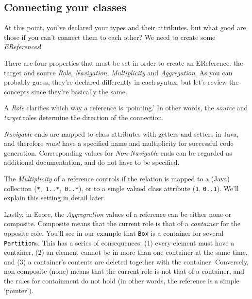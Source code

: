 \newpage
\subsection{Connecting your classes}
\genHeader
\hypertarget{static:references splash}{}

At this point, you've declared your types and their attributes, but what good are those if you can't connect them to each other? We need to create some
\emph{EReferences}!

There are four properties that must be set in order to create an EReference: the target and source \emph{Role}, \emph{Navigation}, \emph{Multiplicity} and
\emph{Aggregation}. As you can probably guess, they're declared differently in each syntax, but let's review the concepts since they're basically the same.

A \emph{Role} clarifies which way a reference is `pointing.' In other words, the \emph{source} and \emph{target} roles determine the direction of the
connection.

\emph{Navigable} ends are mapped to class attributes with getters and setters in Java, and therefore \emph{must} have a specified name and
multiplicity for successful code generation. Corresponding values for \emph{Non-Navigable} ends can  be regarded as additional documentation, and do not have
to be specified.

The \emph{Multiplicity} of a reference controls if the relation is mapped to a (Java) collection (\texttt{*},~\texttt{1..*},~\texttt{0..*}), or to a single
valued class attribute (\texttt{1}, \texttt{0..1}). We'll explain this setting in detail later.

Lastly, in Ecore, the \emph{Aggregration} values of a reference can be either none or com\-po\-site. Composite means that the current role is that of a
\emph{container} for the opposite role. You'll see in our example that \texttt{Box} is a container for several \texttt{Partition}s.
This has a series of consequences: (1) every element must have a container, (2) an element cannot be in more than one container at the same time, and (3) a
container's contents are deleted together with the container. Conversely, non-composite (none) means that the current role is not that of a container,
and the rules for containment do not hold (in other words, the reference is a simple `pointer').






